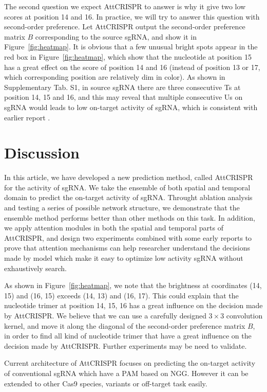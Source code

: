 \documentclass{bioinfo}
\begin{document}
The second question we expect AttCRISPR to answer is why it give two low scores at position 14 and 16. 
In practice, we will try to answer this question with second-order preference. 
Let AttCRISPR output the second-order preference matrix $B$ corresponding to the source sgRNA, and show it in Figure~\ref{fig:heatmap}. 
It is obvious that a few unusual bright spots appear in the red box in Figure~\ref{fig:heatmap}, 
which show that the nucleotide at position 15 has a great effect on the score of position 14 and 16 (instead of position 13 or 17, which corresponding position are relatively dim in color). 
As shown in Supplementary Tab. S1, in source sgRNA there are three consecutive Ts at position 14, 15 and 16, 
and this may reveal that multiple consecutive Us on sgRNA would leads to low on-target activity of sgRNA, 
which is consistent with earlier report \citep{wu2014genome-wide}.\vspace*{-19pt} 

\section{Discussion}

In this article, we have developed a new prediction method, called AttCRISPR for the activity of sgRNA. 
We take the ensemble of both spatial and temporal domain to predict the on-target activity of sgRNA. 
Throught ablation analysis and testing a series of possible network structure, we demonstrate that the ensemble method performs better than other methods on this task. 
In addition, we apply attention modules in both the spatial and temporal parts of AttCRISPR, 
and design two experiments combined with some early reports to prove that attention mechanisms can help researcher understand the decisions made by model which make it easy to optimize low activity sgRNA without exhaustively search. 

As shown in Figure~\ref{fig:heatmap}, we note that the brightness at coordinates (14, 15) and (16, 15) exceeds (14, 13) and (16, 17). 
This could explain that the nucleotide trimer at position 14, 15, 16 has a great influence on the decision made by AttCRISPR. 
We believe that we can use a carefully designed $3\times 3$ convolution kernel, and move it along the diagonal of the second-order preference matrix $B$, 
in order to find all kind of nucleotide trimer that have a great influence on the decision made by AttCRISPR. 
Further experiments may be need to validate. 

Current architecture of AttCRISPR focuses on predicting the on-target activity of conventional sgRNA which have a PAM based on NGG. 
However it can be extended to other Cas9 species, variants or off-target task easily.\vspace*{-19pt}
\end{document}
